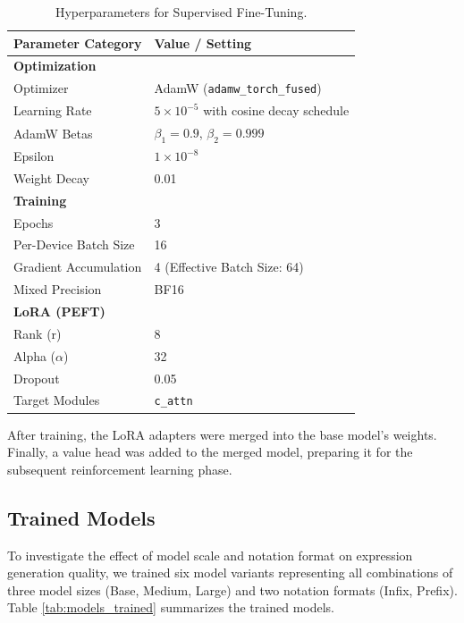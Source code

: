 \begin{table}[h!]
\centering
\caption{Hyperparameters for Supervised Fine-Tuning.}
\label{tab:hyperparameters}
\begin{tabularx}{0.8\textwidth}{lX}
\toprule
\textbf{Parameter Category} & \textbf{Value / Setting} \\
\midrule
\textbf{Optimization} & \\
\quad Optimizer & AdamW (\texttt{adamw\_torch\_fused}) \\
\quad Learning Rate & $5 \times 10^{-5}$ with cosine decay schedule \\
\quad AdamW Betas & $\beta_1 = 0.9$, $\beta_2 = 0.999$ \\
\quad Epsilon & $1 \times 10^{-8}$ \\
\quad Weight Decay & 0.01 \\
\addlinespace
\textbf{Training} & \\
\quad Epochs & 3 \\
\quad Per-Device Batch Size & 16 \\
\quad Gradient Accumulation & 4 (Effective Batch Size: 64) \\
\quad Mixed Precision & BF16 \\
\addlinespace
\textbf{LoRA (PEFT)} & \\
\quad Rank (r) & 8 \\
\quad Alpha ($\alpha$) & 32 \\
\quad Dropout & 0.05 \\
\quad Target Modules & \texttt{c\_attn} \\
\bottomrule
\end{tabularx}
\end{table}

After training, the LoRA adapters were merged into the base model's weights. Finally, a value head was added to the merged model, preparing it for the subsequent reinforcement learning phase.

\subsection{Trained Models}
\label{sec:trained_models}
To investigate the effect of model scale and notation format on expression generation quality, we trained six model variants representing all combinations of three model sizes (Base, Medium, Large) and two notation formats (Infix, Prefix). Table \ref{tab:models_trained} summarizes the trained models.

